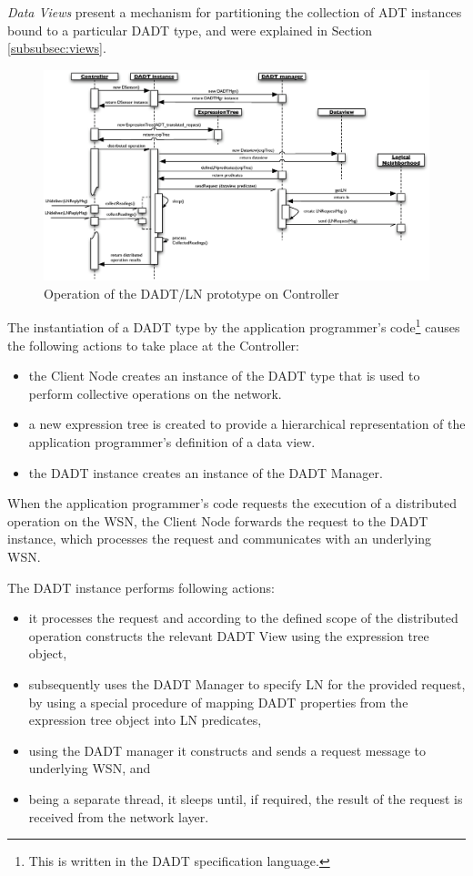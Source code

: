 \emph{Data Views} present a mechanism for partitioning the collection of
ADT instances bound to a particular DADT type, and were explained in Section
\ref{subsubsec:views}.

\begin{figure}
\centering
\includegraphics[width=\textwidth]{img/SeqDiagram_PCnode.eps}
\caption[Operation of the DADT/LN prototype on Controller]{Operation of the DADT/LN prototype on Controller}
\label{Fig:SeqDiagram_PCnode}
\end{figure}

The instantiation of a DADT type by the application programmer's
code\footnote{This is written in the DADT specification language.} causes the
following actions to take place at the Controller:
\begin{itemize}
 \item the Client Node creates an instance of the DADT type that is used to
  perform collective operations on the network.   
  \item a new expression tree
  is created to provide a hierarchical representation of the application programmer's definition of a data view.
  \item the DADT instance creates an instance of the DADT Manager.
\end{itemize}

When the application programmer's code requests the execution of a distributed operation
on the WSN, the Client Node forwards the request to the DADT instance, which
processes the request and communicates with an underlying WSN.

The DADT instance performs following actions:
  \begin{itemize} 
    \item it processes the request and according to the defined scope of the
    distributed operation constructs the relevant DADT View using the
    expression tree object,
    \item subsequently uses the DADT Manager to specify LN for the
    provided request, by using a special procedure of mapping DADT properties
    from the expression tree object into LN predicates,
    \item using the DADT manager it constructs and sends a request message to
    underlying WSN, and
    \item being a separate thread, it sleeps until, if required, the result of
    the request is received from the network layer.
  \end{itemize}
  
